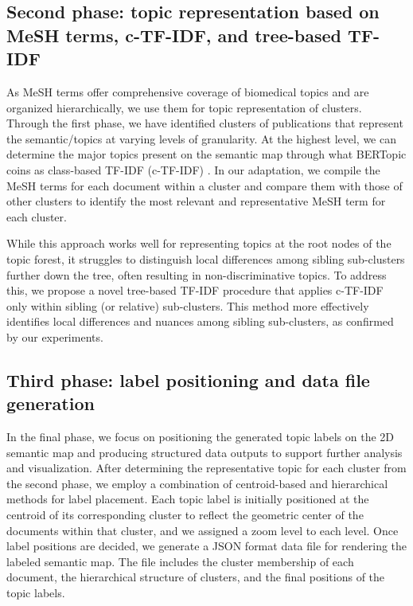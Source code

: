 \documentclass{vgtc}                          %
\begin{document}
\subsection{Second phase: topic representation based on MeSH terms, c-TF-IDF, and tree-based TF-IDF}

As MeSH terms offer comprehensive coverage of biomedical topics and are organized hierarchically, we use them for topic representation of clusters. Through the first phase, we have identified clusters of publications that represent the semantic/topics at varying levels of granularity. At the highest level, we can determine the major topics present on the semantic map through what BERTopic coins as class-based TF-IDF (c-TF-IDF) \cite{Grootendorst2022}. In our adaptation, we compile the MeSH terms for each document within a cluster and compare them with those of other clusters to identify the most relevant and representative MeSH term for each cluster.

While this approach works well for representing topics at the root nodes of the topic forest, it struggles to distinguish local differences among sibling sub-clusters further down the tree, often resulting in non-discriminative topics. To address this, we propose a novel tree-based TF-IDF procedure that applies c-TF-IDF only within sibling (or relative) sub-clusters. This method more effectively identifies local differences and nuances among sibling sub-clusters, as confirmed by our experiments.

\subsection{Third phase: label positioning and data file generation}

In the final phase, we focus on positioning the generated topic labels on the 2D semantic map and producing structured data outputs to support further analysis and visualization. After determining the representative topic for each cluster from the second phase, we employ a combination of centroid-based and hierarchical methods for label placement. Each topic label is initially positioned at the centroid of its corresponding cluster to reflect the geometric center of the documents within that cluster, and we assigned a zoom level to each level. Once label positions are decided, we generate a JSON format data file for rendering the labeled semantic map. The file includes the cluster membership of each document, the hierarchical structure of clusters, and the final positions of the topic labels. 
\end{document}
